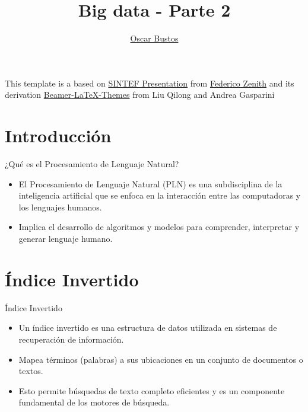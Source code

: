 \documentclass{beamer}
\title{Big data - Parte 2}
\author{\href{mailto:oscar.bustos@javeriana.edu.co}{Oscar Bustos}}
\newcommand{\hrefcol}[2]{\textcolor{cyan}{\href{#1}{#2}}}
\begin{document}
\maketitle


\begin{frame}

This template is a based on \hrefcol{https://www.overleaf.com/latex/templates/sintef-presentation/jhbhdffczpnx}{SINTEF Presentation} from \hrefcol{mailto:federico.zenith@sintef.no}{Federico Zenith} and its derivation \hrefcol{https://github.com/TOB-KNPOB/Beamer-LaTeX-Themes}{Beamer-LaTeX-Themes} from Liu Qilong and Andrea Gasparini


\end{frame}

\section{Introducción}

\begin{frame}{¿Qué es el Procesamiento de Lenguaje Natural?}
  \begin{itemize}
    \item El Procesamiento de Lenguaje Natural (PLN) es una subdisciplina de la inteligencia artificial que se enfoca en la interacción entre las computadoras y los lenguajes humanos.
    \item Implica el desarrollo de algoritmos y modelos para comprender, interpretar y generar lenguaje humano.
  \end{itemize}
\end{frame}

\section{Índice Invertido}

\begin{frame}{Índice Invertido}
  \begin{itemize}
    \item Un índice invertido es una estructura de datos utilizada en sistemas de recuperación de información.
    \item Mapea términos (palabras) a sus ubicaciones en un conjunto de documentos o textos.
    \item Esto permite búsquedas de texto completo eficientes y es un componente fundamental de los motores de búsqueda.
  \end{itemize}
\end{frame}
\end{document}
